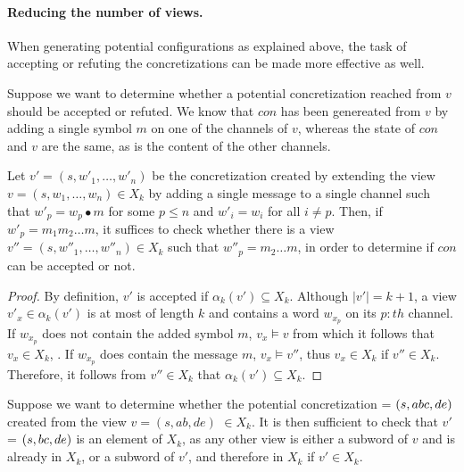 \paragraph{Reducing the number of views.}
When generating potential configurations as explained above, the task of accepting or refuting the concretizations can be made more effective as well.

Suppose we want to determine whether a potential concretization  reached from $v$ should be accepted or refuted. We know that $con$ has been genereated from $v$ by adding a single symbol $m$ on one of the channels of $v$, whereas the state of $con$ and $v$ are the same, as is the content of the other channels.

\begin{lemma}
Let $v' = (s, w'_1, \ldots, w'_n)$ be the concretization created by extending the view $v = (s, w_1, \ldots, w_n) \in X_k$ by adding a single message to a single channel such that $w'_p = w_p \bullet m$ for some $p\leq n$ and $w'_i = w_i$ for all $i \neq p$. Then, if $w'_p = m_1 m_2 \ldots m$, it suffices to check whether there is a view $v'' = (s, w''_1, \ldots, w''_n) \in X_k$ such that $w''_p = m_2\ldots m$, in order to determine if $con$ can be accepted or not.
\end{lemma}

\begin{proof}
By definition, $v'$ is accepted if $\alpha_k(v') \subseteq X_k$. Although $|v'| = k+1$, a view $v'_x \in \alpha_k(v')$ is at most of length $k$ and contains a word $w_{x_p}$ on its $p:th$ channel. If $w_{x_p}$ does not contain the added symbol $m$, $v_x \models v$ from which it follows that $v_x \in X_k$, . If $w_{x_p}$ does contain the message $m$, $v_x \models v''$, thus $v_x \in X_k$ if $v'' \in X_k$. Therefore, it follows from $v'' \in X_k$ that $\alpha_k(v') \subseteq X_k$.



\end{proof}

\begin{exmp}
Suppose we want to determine whether the potential concretization  = $(s, abc, de)$ created from the view $v = (s, ab, de)$ $\in X_k$. It is then sufficient to check that $v'$ = $(s,bc,de)$ is an element of $X_k$, as any other view is either a subword of $v$ and is already in $X_k$, or a subword of $v'$, and therefore in $X_k$ if $v' \in X_k$.
\end{exmp}
\newpage
\newpage

